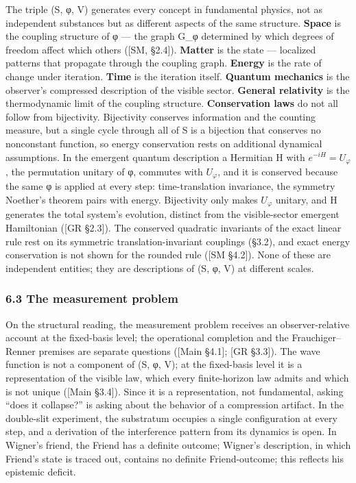 \documentclass[
]{article}
\begin{document}
The triple (S, φ, V) generates every concept in fundamental physics, not
as independent substances but as different aspects of the same
structure. \textbf{Space} is the coupling structure of φ --- the graph
G\_φ determined by which degrees of freedom affect which others ({[}SM,
§2.4{]}). \textbf{Matter} is the state --- localized patterns that
propagate through the coupling graph. \textbf{Energy} is the rate of
change under iteration. \textbf{Time} is the iteration itself.
\textbf{Quantum mechanics} is the observer's compressed description of
the visible sector. \textbf{General relativity} is the thermodynamic
limit of the coupling structure. \textbf{Conservation laws} do not all
follow from bijectivity. Bijectivity conserves information and the
counting measure, but a single cycle through all of S is a bijection
that conserves no nonconstant function, so energy conservation rests on
additional dynamical assumptions. In the emergent quantum description a
Hermitian H with \(e^{-iH} = U_\varphi\), the permutation unitary of φ,
commutes with \(U_\varphi\), and it is conserved because the same φ is
applied at every step: time-translation invariance, the symmetry
Noether's theorem pairs with energy. Bijectivity only makes
\(U_\varphi\) unitary, and H generates the total system's evolution,
distinct from the visible-sector emergent Hamiltonian ({[}GR §2.3{]}).
The conserved quadratic invariants of the exact linear rule rest on its
symmetric translation-invariant couplings (§3.2), and exact energy
conservation is not shown for the rounded rule ({[}SM §4.2{]}). None of
these are independent entities; they are descriptions of (S, φ, V) at
different scales.

\hypertarget{the-measurement-problem}{%
\subsubsection{6.3 The measurement
problem}\label{the-measurement-problem}}

On the structural reading, the measurement problem receives an
observer-relative account at the fixed-basis level; the operational
completion and the Frauchiger--Renner premises are separate questions
({[}Main §4.1{]}; {[}GR §3.3{]}). The wave function is not a component
of (S, φ, V); at the fixed-basis level it is a representation of the
visible law, which every finite-horizon law admits and which is not
unique ({[}Main §3.4{]}). Since it is a representation, not fundamental,
asking ``does it collapse?'' is asking about the behavior of a
compression artifact. In the double-slit experiment, the substratum
occupies a single configuration at every step, and a derivation of the
interference pattern from its dynamics is open. In Wigner's friend, the
Friend has a definite outcome; Wigner's description, in which Friend's
state is traced out, contains no definite Friend-outcome; this reflects
his epistemic deficit.
\end{document}
